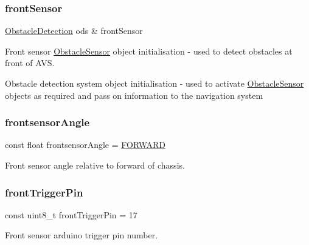 \mbox{\label{bot_main_8ino_a355879266d10af4a6e9126a47bc09113}} 
\subsubsection{\texorpdfstring{front\+Sensor}{frontSensor}}
{\footnotesize\ttfamily \mbox{\hyperlink{class_obstacle_detection}{Obstacle\+Detection}} ods \& front\+Sensor}



Front sensor \mbox{\hyperlink{class_obstacle_sensor}{Obstacle\+Sensor}} object initialisation -\/ used to detect obstacles at front of A\+VS. 

Obstacle detection system object initialisation -\/ used to activate \mbox{\hyperlink{class_obstacle_sensor}{Obstacle\+Sensor}} objects as required and pass on information to the navigation system \mbox{\label{bot_main_8ino_ad681cfe410d5d764c513368773b9de93}} 
\subsubsection{\texorpdfstring{frontsensor\+Angle}{frontsensorAngle}}
{\footnotesize\ttfamily const float frontsensor\+Angle = \mbox{\hyperlink{bot_main_8ino_a6ddfdda7a062d10cff4a72b76b44aeb8}{F\+O\+R\+W\+A\+RD}}}



Front sensor angle relative to forward of chassis. 

\mbox{\label{bot_main_8ino_a33df7a8dbfd90327fda79c01f944f56a}} 
\subsubsection{\texorpdfstring{front\+Trigger\+Pin}{frontTriggerPin}}
{\footnotesize\ttfamily const uint8\+\_\+t front\+Trigger\+Pin = 17}



Front sensor arduino trigger pin number. 

